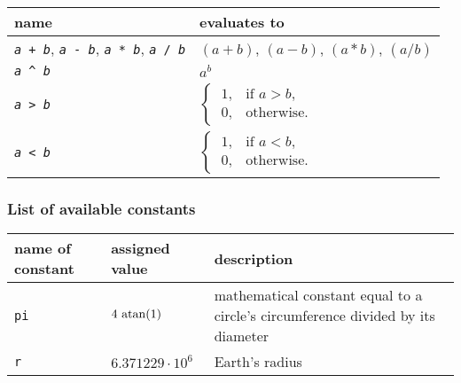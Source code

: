 \begin{tabular}{|p{3cm}|p{7cm}|}
  \hline
  name                              & evaluates to \\
  \hline\hline
  \raggedright%
  \texttt{\textit{a}~+~\textit{b}},
  \texttt{\textit{a}~-~\textit{b}},
  \texttt{\textit{a}~*~\textit{b}},
  \texttt{\textit{a}~/~\textit{b}}  & $(a+b)$, $(a-b)$, $(a*b)$, $(a/b)$ \\[0.5em]
  \texttt{\textit{a}~\^~\textit{b}} & $a^b$                              \\[0.5em]
  \texttt{\textit{a}~>~\textit{b}}  & $\begin{cases}
                                        ~  1, & \text{if } a > b, \\
                                        ~  0, & \text{otherwise}.
                                       \end{cases}$                      \\[1.5em]
  \texttt{\textit{a}~<~\textit{b}}  & $\begin{cases}
                                        ~  1, & \text{if } a < b, \\
                                        ~  0, & \text{otherwise}.
                                       \end{cases}$                      \\[0.5em]
  \hline
\end{tabular}



\subsubsection{List of available constants}

\begin{tabular}{|l|l|p{7cm}|}
  \hline
  name of constant & assigned value & description \\
  \hline\hline
  \texttt{pi} & $4 \, \operatorname{atan}(1)$     & mathematical constant equal to a circle's circumference 
                                      divided by its diameter  \\
  \texttt{r}  & $6.371229\cdot10^6$ & Earth's radius\footnotemark[1]  \\
  \hline
\end{tabular}


